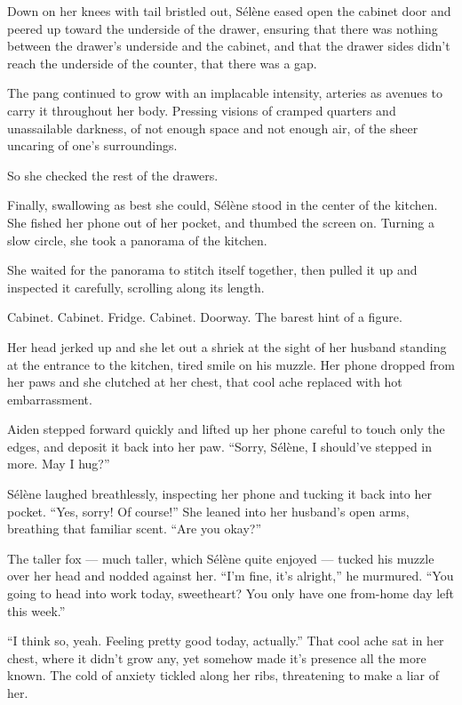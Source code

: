 Down on her knees with tail bristled out, Sélène eased open the cabinet door and peered up toward the underside of the drawer, ensuring that there was nothing between the drawer's underside and the cabinet, and that the drawer sides didn't reach the underside of the counter, that there was a gap.

The pang continued to grow with an implacable intensity, arteries as avenues to carry it throughout her body. Pressing visions of cramped quarters and unassailable darkness, of not enough space and not enough air, of the sheer uncaring of one's surroundings.

So she checked the rest of the drawers.

Finally, swallowing as best she could, Sélène stood in the center of the kitchen. She fished her phone out of her pocket, and thumbed the screen on. Turning a slow circle, she took a panorama of the kitchen.

She waited for the panorama to stitch itself together, then pulled it up and inspected it carefully, scrolling along its length.

Cabinet. Cabinet. Fridge. Cabinet. Doorway. The barest hint of a figure.

Her head jerked up and she let out a shriek at the sight of her husband standing at the entrance to the kitchen, tired smile on his muzzle. Her phone dropped from her paws and she clutched at her chest, that cool ache replaced with hot embarrassment.

Aiden stepped forward quickly and lifted up her phone careful to touch only the edges, and deposit it back into her paw. ``Sorry, Sélène, I should've stepped in more. May I hug?''

Sélène laughed breathlessly, inspecting her phone and tucking it back into her pocket. ``Yes, sorry! Of course!'' She leaned into her husband's open arms, breathing that familiar scent. ``Are you okay?''

The taller fox --- much taller, which Sélène quite enjoyed --- tucked his muzzle over her head and nodded against her. ``I'm fine, it's alright,'' he murmured. ``You going to head into work today, sweetheart? You only have one from-home day left this week.''

``I think so, yeah. Feeling pretty good today, actually.'' That cool ache sat in her chest, where it didn't grow any, yet somehow made it's presence all the more known. The cold of anxiety tickled along her ribs, threatening to make a liar of her.

